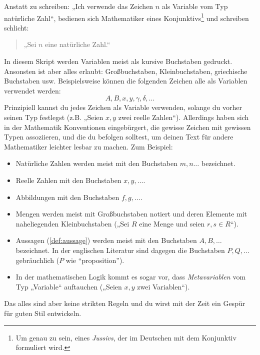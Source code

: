 \begin{nota}
    Anstatt zu schreiben: „Ich verwende das Zeichen $n$ als Variable vom Typ natürliche Zahl“, bedienen sich Mathematiker eines Konjunktivs\footnote{Um genau zu sein, eines \emph{Jussivs}, der im Deutschen mit dem Konjunktiv formuliert wird.} und schreiben schlicht:
    \begin{quote}
        „Sei $n$ eine natürliche Zahl.“
    \end{quote}
    In diesem Skript werden Variablen meist als kursive Buchstaben gedruckt. Ansonsten ist aber alles erlaubt: Großbuchstaben, Kleinbuchstaben, griechische Buchstaben usw. Beispielsweise können die folgenden Zeichen alle als Variablen verwendet werden:
        \[ A,B,x,y,\gamma,\delta,\dots \]
    Prinzipiell kannst du jedes Zeichen als Variable verwenden, solange du vorher seinen Typ festlegst (z.B. „Seien $x,y$ zwei reelle Zahlen“). Allerdings haben sich in der Mathematik Konventionen eingebürgert, die gewisse Zeichen mit gewissen Typen assoziieren, und die du befolgen solltest, um deinen Text für andere Mathematiker leichter lesbar zu machen. Zum Beispiel:
    \begin{itemize}
        \item Natürliche Zahlen werden meist mit den Buchstaben $m,n\dots$ bezeichnet.
        \item Reelle Zahlen mit den Buchstaben $x,y,\dots$.
        \item Abbildungen mit den Buchstaben $f,g,\dots$.
        \item Mengen werden meist mit Großbuchstaben notiert und deren Elemente mit naheliegenden Kleinbuchstaben („Sei $R$ eine Menge und seien $r,s\in R$“).
        \item Aussagen (\cref{def:aussage}) werden meist mit den Buchstaben $A,B,\dots$ bezeichnet. In der englischen Literatur sind dagegen die Buchstaben $P,Q,\dots$ gebräuchlich ($P$ wie ``proposition'').
        \item In der mathematischen Logik kommt es sogar vor, dass \emph{Metavariablen} vom Typ „Variable“ auftauchen („Seien $x,y$ zwei Variablen“).
    \end{itemize}
    Das alles sind aber keine strikten Regeln und du wirst mit der Zeit ein Gespür für guten Stil entwickeln.
\end{nota}


